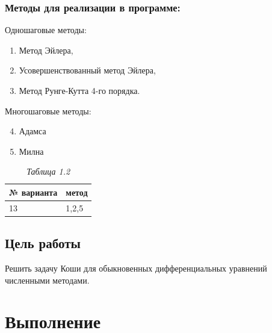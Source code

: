 \documentclass{article}
\begin{document}
      \subsubsection{Методы для реализации в программе:}
            Одношаговые методы:
            \begin{enumerate}
                  \item Метод Эйлера,
                  \item Усовершенствованный метод Эйлера,
                  \item Метод Рунге-Кутта 4-го порядка.
            \end{enumerate}
            Многошаговые методы:         
            \begin{enumerate}
            	\setcounter{enumi}{3}
            	\item Адамса
            	\item Милна
            \end{enumerate}
            \begin{table}[H]
                  \begin{tabular}{|l|l|}
                        \hline
                        № варианта & метод \\ \hline
                        13 & 1,2,5 \\ \hline
                  \end{tabular}
                  \caption{\small \sl {Таблица 1.2}} 
            \end{table}
\subsection{Цель работы}
      Решить задачу Коши для обыкновенных дифференциальных уравнений численными методами.



\section{Выполнение}            
\end{document}
